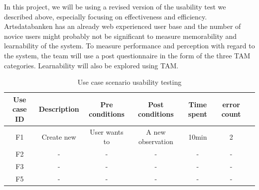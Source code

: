 In this project, we will be using a revised version of the usability test we described above, especially focusing on effectiveness and efficiency. Artsdatabanken has an already web experienced user base and the number of novice users might probably not be significant to measure memorability and learnability of the system.
To measure performance and perception with regard to the system, the team will use a post questionnaire in the form of the three TAM categories. Learnability will also be explored using TAM.

\begin{table}[h]
\centering
\caption{Use case scenario usability testing\cite{tam:doc5}} %
     
\begin{tabular}{|c|c|c|c|c|c|p{3cm}|} %
\hline\hline %
Use case ID & Description & Pre conditions & Post conditions & Time spent & error count \\

\hline %
F1 & Create new  & User wants to  & A new observation  & 10min & 2 \\
\hline
F2 & - & - & - & - & - \\
F3 & - & - & - & - & -\\
F5 & - & - & - & - & -\\
\hline %
\end{tabular}
\label{table:nonlin} %
\end{table}


